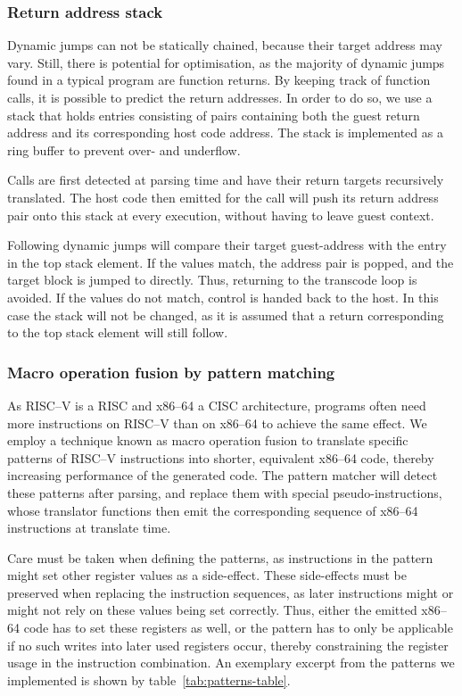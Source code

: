 \subsubsection{Return address stack}
\label{sec:return-address-stack}
Dynamic jumps can not be statically chained, because their target address may vary.
Still, there is potential for optimisation, as the majority of dynamic jumps found in a typical program are function returns.
By keeping track of function calls, it is possible to predict the return addresses.
In order to do so, we use a stack that holds entries consisting of pairs containing both the guest return address and its corresponding host code address.
The stack is implemented as a ring buffer to prevent over- and underflow.

Calls are first detected at parsing time and have their return targets recursively translated.
The host code then emitted for the call will push its return address pair onto this stack at every execution, without having to leave guest context. %

Following dynamic jumps will compare their target guest-address with the entry in the top stack element.
If the values match, the address pair is popped, and the target block is jumped to directly.
Thus, returning to the transcode loop is avoided.
If the values do not match, control is handed back to the host.
In this case the stack will not be changed, as it is assumed that a return corresponding to the top stack element will still follow.


\subsubsection{Macro operation fusion by pattern matching}
\label{sec:pattern-matching}
As RISC--V is a RISC and x86--64 a CISC architecture, programs often need more instructions on RISC--V than on x86--64 to achieve the same effect.
We employ a technique known as macro operation fusion to translate specific patterns of RISC--V instructions into shorter, equivalent x86--64 code, thereby increasing performance of the generated code.
The pattern matcher will detect these patterns after parsing, and replace them with special pseudo-instructions, whose translator functions then emit the corresponding sequence of x86--64 instructions at translate time.

Care must be taken when defining the patterns, as instructions in the pattern might set other register values as a side-effect.
These side-effects must be preserved when replacing the instruction sequences, as later instructions might or might not rely on these values being set correctly.
Thus, either the emitted x86--64 code has to set these registers as well, or the pattern has to only be applicable if no such writes into later used registers occur, thereby constraining the register usage in the instruction combination.
An exemplary excerpt from the patterns we implemented is shown by table~\ref{tab:patterns-table}.

